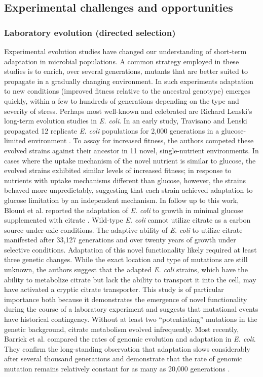 \subsection{Experimental challenges and opportunities}

\subsubsection{Laboratory evolution (directed selection)}

Experimental evolution studies have changed our understanding of short-term adaptation in microbial populations.  A common strategy employed in these studies is to enrich, over several generations, mutants that are better suited to propagate in a gradually changing environment.  In such experiments adaptation to new conditions (improved fitness relative to the ancestral genotype) emerges quickly, within a few to hundreds of generations depending on the type and severity of stress.   Perhaps most well-known and celebrated are Richard Lenski's long-term evolution studies in \textit{E. coli}.  In an early study, Travisano and Lenski propagated 12 replicate \textit{E. coli} populations for 2,000 generations in a glucose-limited environment \cite{travisano_long-term_1996}. To assay for increased fitness, the authors competed these evolved strains against their ancestor in 11 novel, single-nutrient environments. In cases where the uptake mechanism of the novel nutrient is similar to glucose, the evolved strains exhibited similar levels of increased fitness; in response to nutrients with uptake mechanisms different than glucose, however, the strains behaved more unpredictably, suggesting that each strain achieved adaptation to glucose limitation by an independent mechanism.  In follow up to this work, Blount et al. reported the adaptation of \textit{E. coli} to growth in minimal glucose supplemented with citrate \cite{blount_historical_2008}. Wild-type \textit{E. coli} cannot utilize citrate as a carbon source under oxic conditions. The adaptive ability of \textit{E. coli} to utilize citrate manifested after 33,127 generations and over twenty years of growth under selective conditions. Adaptation of this novel functionality likely required at least three genetic changes. While the exact location and type of mutations are still unknown, the authors suggest that the adapted \textit{E. coli} strains, which have the ability to metabolize citrate but lack the ability to transport it into the cell, may have activated a cryptic citrate transporter. This study is of particular importance both because it demonstrates the emergence of novel functionality during the course of a laboratory experiment and suggests that mutational events have historical contingency. Without at least two ``potentiating'' mutations in the genetic background, citrate metabolism evolved infrequently. Most recently, Barrick et al. compared the rates of genomic evolution and adaptation in \textit{E. coli}. They confirm the long-standing observation that adaptation slows considerably after several thousand generations \cite{lenski_quantifying_1991} and demonstrate that the rate of genomic mutation remains relatively constant for as many as 20,000 generations \cite{barrick_genome_2009}. 